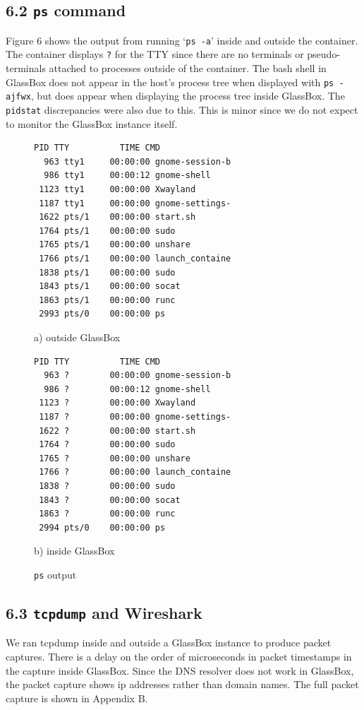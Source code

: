 \documentclass{proc}
\begin{document}
\subsection*{6.2 \texttt{ps} command}
Figure 6 shows the output from running `\texttt{ps -a}' inside and outside the container. The container displays \texttt{?} for the TTY since there are no terminals or pseudo-terminals attached to processes outside of the container. The bash shell in GlassBox does not appear in the host's process tree when displayed with \texttt{ps -ajfwx},  but does appear when displaying the process tree inside GlassBox. The \texttt{pidstat} discrepancies were also due to this. This is minor since we do not expect to monitor the GlassBox instance itself. 
 \begin{figure}[h]
\begin{lstlisting}[linewidth=\linewidth]
  PID TTY          TIME CMD
  963 tty1     00:00:00 gnome-session-b
  986 tty1     00:00:12 gnome-shell
 1123 tty1     00:00:00 Xwayland
 1187 tty1     00:00:00 gnome-settings-
 1622 pts/1    00:00:00 start.sh
 1764 pts/1    00:00:00 sudo
 1765 pts/1    00:00:00 unshare
 1766 pts/1    00:00:00 launch_containe
 1838 pts/1    00:00:00 sudo
 1843 pts/1    00:00:00 socat
 1863 pts/1    00:00:00 runc
 2993 pts/0    00:00:00 ps
 \end{lstlisting}
\hspace{7.5em} a) outside GlassBox
 \begin{lstlisting}[linewidth=\linewidth]
  PID TTY          TIME CMD
  963 ?        00:00:00 gnome-session-b
  986 ?        00:00:12 gnome-shell
 1123 ?        00:00:00 Xwayland
 1187 ?        00:00:00 gnome-settings-
 1622 ?        00:00:00 start.sh
 1764 ?        00:00:00 sudo
 1765 ?        00:00:00 unshare
 1766 ?        00:00:00 launch_containe
 1838 ?        00:00:00 sudo
 1843 ?        00:00:00 socat
 1863 ?        00:00:00 runc
 2994 pts/0    00:00:00 ps
\end{lstlisting}
\hspace{7.5em} b) inside GlassBox
 \caption{\texttt{ps} output}
\end{figure}

\subsection*{6.3 \texttt{tcpdump} and Wireshark}
We ran tcpdump inside and outside a GlassBox instance to produce packet captures. There is a delay on the order of microseconds in packet timestamps in the capture inside GlassBox. Since the DNS resolver does not work in GlassBox, the packet capture shows ip addresses rather than domain names. The full packet capture is shown in Appendix B. 
\end{document}
